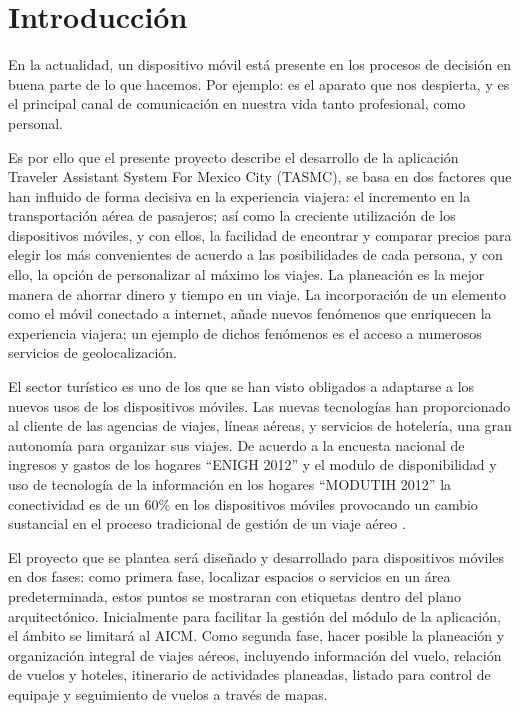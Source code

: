 
\chapter{Introducción} %

\label{Introduccion} %



En la actualidad, un dispositivo móvil está presente en los procesos de decisión en buena parte de lo que hacemos. Por ejemplo: es el aparato que nos despierta, y es el principal canal de comunicación en nuestra vida tanto profesional, como personal.

Es por ello que el presente proyecto describe el desarrollo de la aplicación Traveler Assistant System For Mexico City (TASMC), se basa en dos factores que han influido de forma decisiva en la experiencia viajera: el incremento en la transportación aérea de pasajeros; así como la creciente utilización de los dispositivos móviles, y con ellos, la facilidad de encontrar y comparar precios para elegir los más convenientes de acuerdo a las posibilidades de cada persona, y con ello, la opción de personalizar al máximo los viajes. La planeación es la mejor manera de ahorrar dinero y tiempo en un viaje. La incorporación de un elemento como el móvil conectado a internet, añade  nuevos fenómenos que enriquecen la experiencia viajera; un ejemplo de dichos fenómenos es el acceso a numerosos servicios de geolocalización.

El sector turístico es uno de los que se han visto obligados a adaptarse a los nuevos usos de los dispositivos móviles. Las nuevas tecnologías han proporcionado al cliente de las agencias de viajes, líneas aéreas, y servicios de hotelería, una gran autonomía \cite{appsVIajar} para organizar sus viajes. De acuerdo a la encuesta nacional de ingresos y gastos de los hogares “ENIGH 2012” y el modulo de disponibilidad y uso de tecnología de la información en los hogares “MODUTIH 2012” la conectividad es de un 60\% en los dispositivos móviles provocando un cambio sustancial en el proceso tradicional de gestión de un viaje aéreo \cite{endutih}.

El proyecto que se plantea será diseñado y desarrollado para dispositivos móviles en dos fases: como primera fase, localizar espacios o servicios en un área predeterminada, estos puntos se mostraran con etiquetas dentro del plano arquitectónico. Inicialmente para facilitar la gestión del módulo de la aplicación, el ámbito se limitará al AICM. Como segunda fase, hacer posible la planeación y organización integral de viajes aéreos, incluyendo información del vuelo, relación de vuelos y hoteles, itinerario de actividades planeadas, listado para control de equipaje y seguimiento de vuelos a través de mapas.


